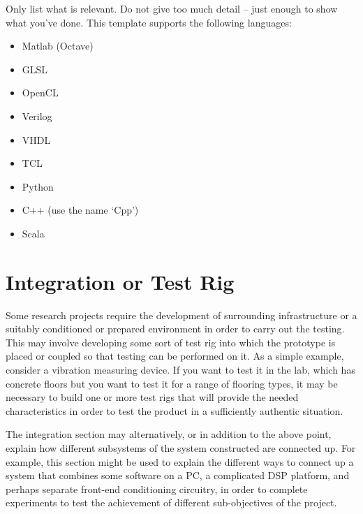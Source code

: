 \begin{minipage}[t]{\textwidth} %
  Only list what is relevant.  Do not give too much detail -- just enough to show what you've done.  This template supports the following languages:
  
  \vspace{-2ex} %
  \begin{itemize}\setlength{\itemsep}{-1ex} %
    \item Matlab (Octave)
    \item GLSL
    \item OpenCL
    \item Verilog
    \item VHDL
    \item TCL
    \item Python
    \item C++ (use the name `Cpp')
    \item Scala
  \end{itemize}
\end{minipage}

\section{Integration or Test Rig}

Some research projects require the development of surrounding infrastructure or a suitably conditioned or prepared environment in order to carry out the testing. This may involve developing some sort of test rig into which the prototype is placed or coupled so that testing can be performed on it.  As a simple example, consider a vibration measuring device. If you want to test it in the lab, which has concrete floors but you want to test it for a range of flooring types, it may be necessary to build one or more test rigs that will provide the needed characteristics in order to test the product in a sufficiently authentic situation.

The integration section may alternatively, or in addition to the above point, explain how different subsystems of the system constructed are connected up.  For example, this section might be used to explain the different ways to connect up a system that combines some software on a PC, a complicated DSP platform, and perhaps separate front-end conditioning circuitry, in order to complete experiments to test the achievement of different sub-objectives of the project.
